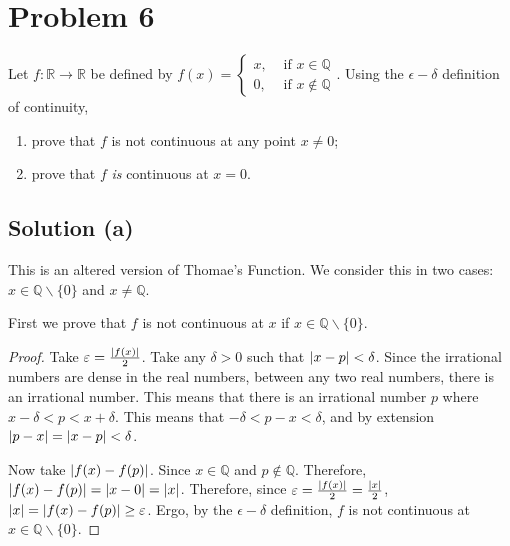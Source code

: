 \documentclass[11pt]{article}
\begin{document}
    \pagebreak
\section{Problem 6}
    Let $f : \mathbb{R} \to \mathbb{R}$ be defined by $f(x) = \begin{cases} x, & \text{ if } x \in \mathbb{Q}\\ 0, &\text{ if } x \notin \mathbb{Q}\end{cases}.$ Using the $\epsilon-\delta$ definition of continuity,
    \begin{enumerate}[label=(\alph*)]
        \item 
        prove that $f$ is not continuous at any point $x \neq 0$;
        
        \item
        prove that $f$ \textit{is} continuous at $x = 0$.
        
    \end{enumerate}

    \subsection{Solution (a)}
        This is an altered version of Thomae's Function.
        We consider this in two cases: $x \in \mathbb{Q} \backslash \{0\}$ and $x \neq \mathbb{Q}$.

        First we prove that $f$ is not continuous at $x$ if $x \in \mathbb{Q} \backslash \{0\}$.
        \begin{proof}
            Take $\varepsilon = \frac{\left| f(x) \right|}{2}$.
            Take any $\delta > 0$ such that $\left| x - p \right| < \delta$.
            Since the irrational numbers are dense in the real numbers, between any two real numbers, there is an irrational number.
            This means that there is an irrational number $p$ where $x - \delta < p < x + \delta$.
            This means that $-\delta < p - x < \delta$, and by extension $\left| p - x \right| = \left| x - p \right| < \delta$.

            Now take $\left| f(x) - f(p) \right|$.
            Since $x \in \mathbb{Q}$ and $p \notin \mathbb{Q}$.
            Therefore, $\left| f(x) - f(p) \right| = \left| x - 0 \right| = \left| x \right|$.
            Therefore, since $\varepsilon = \frac{\left| f(x) \right|}{2} = \frac{\left| x \right|}{2}$, $\left| x \right| = \left| f(x) - f(p) \right| \geq \varepsilon$.
            Ergo, by the $\epsilon-\delta$ definition, $f$ is not continuous at $x \in \mathbb{Q} \backslash \{0\}$.
        \end{proof}
\end{document}
